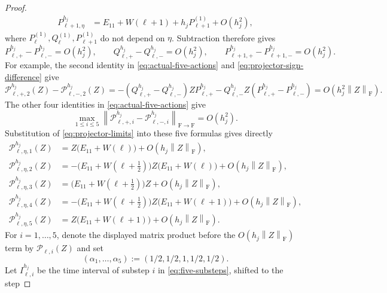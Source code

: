 \documentclass[10pt,a4paper]{amsart}
\numberwithin{equation}{section}
\newcommand{\F}{\mathrm F}
\newcommand{\norm}[1]{\left\lVert #1\right\rVert}
\begin{document}
\begin{proof}
\begin{align*}
 P^{h_j}_{\ell+1,\eta}
 &=E_{11}+W(\ell+1)+h_jP^{(1)}_{\ell+1}+O(h_j^2),
\end{align*}
where \(P^{(1)}_{\ell},Q^{(1)}_{\ell},P^{(1)}_{\ell+1}\) do not
depend on \(\eta\).  Subtraction therefore gives
\begin{equation}\label{eq:projector-sign-difference}
 P^{h_j}_{\ell,+}-P^{h_j}_{\ell,-}=O(h_j^2),\qquad
 Q^{h_j}_{\ell,+}-Q^{h_j}_{\ell,-}=O(h_j^2),\qquad
 P^{h_j}_{\ell+1,+}-P^{h_j}_{\ell+1,-}=O(h_j^2).
\end{equation}
For example, the second identity in
\eqref{eq:actual-five-actions} and
\eqref{eq:projector-sign-difference} give
\[
 \mathcal P^{h_j}_{\ell,+,2}(Z)-\mathcal P^{h_j}_{\ell,-,2}(Z)
 =-(Q^{h_j}_{\ell,+}-Q^{h_j}_{\ell,-})
 ZP^{h_j}_{\ell,+}
 -Q^{h_j}_{\ell,-}Z
 (P^{h_j}_{\ell,+}-P^{h_j}_{\ell,-})
 =O(h_j^2\norm Z_{\F}).
\]
The other four identities in \eqref{eq:actual-five-actions} give
\begin{equation}\label{eq:action-sign-difference}
 \max_{1\le i\le5}
 \norm{\mathcal P^{h_j}_{\ell,+,i}
       -\mathcal P^{h_j}_{\ell,-,i}}_{\F\to\F}
 =O(h_j^2).
\end{equation}
Substitution of \eqref{eq:projector-limits} into these five formulas
gives directly
\begin{equation}\label{eq:five-actions}
\begin{aligned}
 \mathcal P^{h_j}_{\ell,\eta,1}(Z)
 &=Z\bigl(E_{11}+W(\ell)\bigr)+O(h_j\norm Z_{\F}),\\
 \mathcal P^{h_j}_{\ell,\eta,2}(Z)
 &=-\bigl(E_{11}+W(\ell+\tfrac12)\bigr)
 Z\bigl(E_{11}+W(\ell)\bigr)+O(h_j\norm Z_{\F}),\\
 \mathcal P^{h_j}_{\ell,\eta,3}(Z)
 &=\bigl(E_{11}+W(\ell+\tfrac12)\bigr)Z
 +O(h_j\norm Z_{\F}),\\
 \mathcal P^{h_j}_{\ell,\eta,4}(Z)
 &=-\bigl(E_{11}+W(\ell+\tfrac12)\bigr)
 Z\bigl(E_{11}+W(\ell+1)\bigr)+O(h_j\norm Z_{\F}),\\
 \mathcal P^{h_j}_{\ell,\eta,5}(Z)
 &=Z\bigl(E_{11}+W(\ell+1)\bigr)+O(h_j\norm Z_{\F}).
\end{aligned}
\end{equation}
For $i=1,\ldots,5$, denote the displayed matrix product before the
$O(h_j\norm Z_{\F})$ term by $\mathcal P_{\ell,i}(Z)$ and set
\begin{equation}\label{eq:substep-lengths}
 (\alpha_1,\ldots,\alpha_5):=(1/2,1/2,1,1/2,1/2).
\end{equation}
Let $I^{h_j}_{\ell,i}$ be the time interval of substep $i$ in
\eqref{eq:five-substeps}, shifted to the step

\end{proof}
\end{document}
